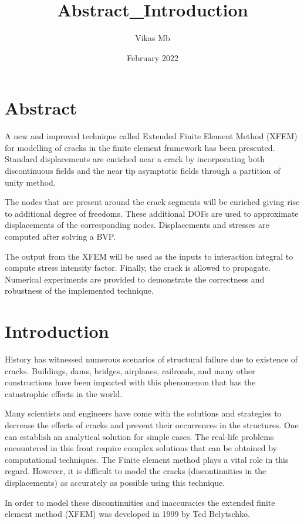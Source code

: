 \documentclass[fleqn, 12.5pt,a4paper]{report}
\title{Abstract_Introduction}
\author{Vikas Mb}
\date{February 2022}
\begin{document}

\tableofcontents
\listoffigures
\newpage

\section{\color{Black} \large{Abstract}}
A new and improved technique called Extended Finite Element Method (XFEM) for modelling of cracks in the finite element framework has been presented. Standard displacements are enriched near a crack by incorporating both discontinuous fields and the near tip asymptotic fields through a partition of unity method\cite{khoei2014extended}. \par
\vspace{0.25cm}
The nodes that are present around the crack segments will be enriched giving rise to additional degree of freedoms. These additional DOFs are used to approximate displacements of the corresponding nodes. Displacements and stresses are computed after solving a BVP. \par 
\vspace{0.25cm}
The output from the XFEM will be used as the inputs to interaction integral to compute stress intensity factor. Finally, the crack is allowed to propagate. Numerical experiments are provided to demonstrate the correctness and robustness of the implemented technique.

\section{\color{Black} \large{Introduction}}
History has witnessed numerous scenarios of structural failure due to existence of cracks. Buildings, dams, bridges, airplanes, railroads, and many other constructions have been impacted with this phenomenon that has the catastrophic effects in the world\cite{kuna2013finite}. \par
\vspace{0.25cm}
Many scientists and engineers have come with the solutions and strategies to decrease the effects of cracks and prevent their occurrences in the structures. 
One can establish an analytical solution for simple cases. The real-life problems encountered in this front require complex solutions that can be obtained by computational techniques\cite{kuna2013finite}. The Finite element method plays a vital role in this regard. However, it is difficult to model the cracks (discontinuities in the displacements) as accurately as possible using this technique. \par
\vspace{0.25cm}
In order to model these discontinuities and inaccuracies the extended finite element method (XFEM) was developed in 1999 by Ted Belytschko\cite{belytschko1999elastic}.
\end{document}
